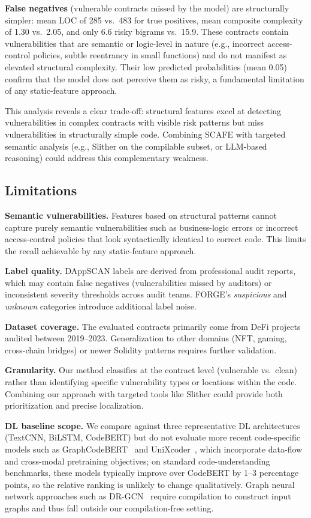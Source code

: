 \documentclass[11pt,a4paper]{article}
\newcommand{\MethodName}{SCAFE\xspace}
\begin{document}
\textbf{False negatives} (vulnerable contracts missed by the model) are structurally simpler: mean LOC of 285 vs.\ 483 for true positives, mean composite complexity of 1.30 vs.\ 2.05, and only 6.6 risky bigrams vs.\ 15.9.
These contracts contain vulnerabilities that are semantic or logic-level in nature (e.g., incorrect access-control policies, subtle reentrancy in small functions) and do not manifest as elevated structural complexity.
Their low predicted probabilities (mean 0.05) confirm that the model does not perceive them as risky, a fundamental limitation of any static-feature approach.

This analysis reveals a clear trade-off: structural features excel at detecting vulnerabilities in complex contracts with visible risk patterns but miss vulnerabilities in structurally simple code.
Combining \MethodName with targeted semantic analysis (e.g., Slither on the compilable subset, or LLM-based reasoning) could address this complementary weakness.

\subsection{Limitations}

\textbf{Semantic vulnerabilities.}
Features based on structural patterns cannot capture purely semantic vulnerabilities such as business-logic errors or incorrect access-control policies that look syntactically identical to correct code.
This limits the recall achievable by any static-feature approach.

\textbf{Label quality.}
DAppSCAN labels are derived from professional audit reports, which may contain false negatives (vulnerabilities missed by auditors) or inconsistent severity thresholds across audit teams.
FORGE's \emph{suspicious} and \emph{unknown} categories introduce additional label noise.

\textbf{Dataset coverage.}
The evaluated contracts primarily come from DeFi projects audited between 2019--2023.
Generalization to other domains (NFT, gaming, cross-chain bridges) or newer Solidity patterns requires further validation.

\textbf{Granularity.}
Our method classifies at the contract level (vulnerable vs.\ clean) rather than identifying specific vulnerability types or locations within the code.
Combining our approach with targeted tools like Slither could provide both prioritization and precise localization.

\textbf{DL baseline scope.}
We compare against three representative DL architectures (TextCNN, BiLSTM, CodeBERT) but do not evaluate more recent code-specific models such as GraphCodeBERT~\cite{guo2021graphcodebert} and UniXcoder~\cite{guo2022unixcoder}, which incorporate data-flow and cross-modal pretraining objectives; on standard code-understanding benchmarks, these models typically improve over CodeBERT by 1--3 percentage points, so the relative ranking is unlikely to change qualitatively.
Graph neural network approaches such as DR-GCN~\cite{zhuang2020smart} require compilation to construct input graphs and thus fall outside our compilation-free setting.
\end{document}
